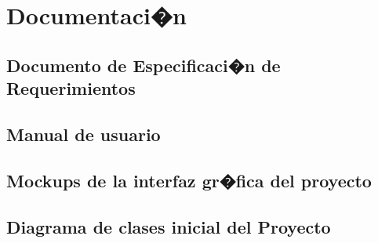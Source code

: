%
%


\chapter{Documentaci�n}
\label{ap1:documentacion}

	\section{Documento de Especificaci�n de Requerimientos}
		\label{ap1:ERS}
		
	\section{Manual de usuario}
		\label{ap1:user_manual}
	
	\section{Mockups de la interfaz gr�fica del proyecto}
		\label{ap1:GUI}
	


	
	\section{Diagrama de clases inicial del Proyecto}
		\label{ap1:classDiagra_v0}



